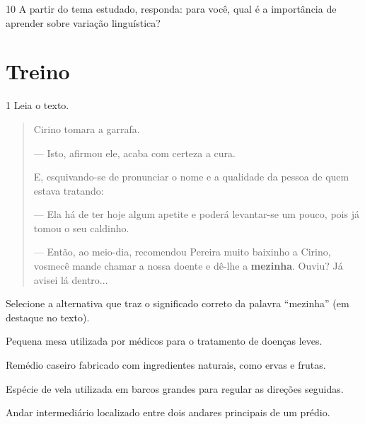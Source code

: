 \num{10} A partir do tema estudado, responda: para você, qual é a importância de
aprender sobre variação linguística?


\section{Treino}

\num{1} Leia o texto.

\begin{quote}
Cirino tomara a garrafa.

--- Isto, afirmou ele, acaba com certeza a cura.

E, esquivando-se de pronunciar o nome e a qualidade da pessoa de quem
estava tratando:

--- Ela há de ter hoje algum apetite e poderá levantar-se um pouco, pois
já tomou o seu caldinho.

--- Então, ao meio-dia, recomendou Pereira muito baixinho a Cirino,
vosmecê mande chamar a nossa doente e dê-lhe a \textbf{mezinha}. Ouviu?
Já avisei lá dentro...

\end{quote}

Selecione a alternativa que traz o significado correto da palavra “mezinha” (em destaque no texto).

\begin{escolha}
\item Pequena mesa utilizada por médicos para o tratamento de doenças leves.

\item Remédio caseiro fabricado com ingredientes naturais, como ervas e frutas.

\item Espécie de vela utilizada em barcos grandes para regular as direções seguidas.

\item Andar intermediário localizado entre dois andares principais de um prédio.
\end{escolha}

